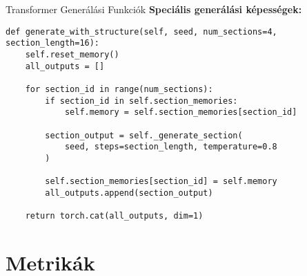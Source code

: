 \documentclass[aspectratio=169]{beamer}
\begin{document}
\begin{frame}[fragile]{Transformer Generálási Funkciók}
\textbf{Speciális generálási képességek:}

\begin{lstlisting}
def generate_with_structure(self, seed, num_sections=4, section_length=16):
    self.reset_memory()
    all_outputs = []
    
    for section_id in range(num_sections):
        if section_id in self.section_memories:
            self.memory = self.section_memories[section_id]
        
        section_output = self._generate_section(
            seed, steps=section_length, temperature=0.8
        )
        
        self.section_memories[section_id] = self.memory
        all_outputs.append(section_output)
    
    return torch.cat(all_outputs, dim=1)
\end{lstlisting}
\end{frame}

\section{Metrikák}
\end{document}
